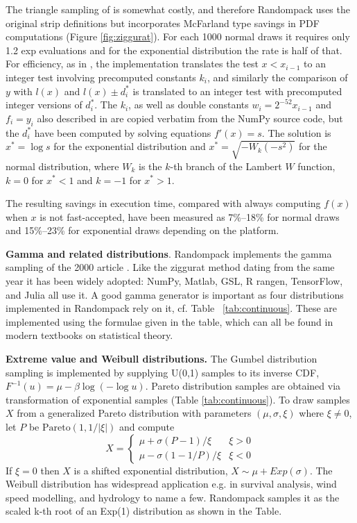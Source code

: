 \documentclass[manuscript,screen,review]{acmart}
\begin{document}
The triangle sampling of \cite{McFarland2016} is somewhat costly, and
therefore Randompack uses the original strip definitions but
incorporates McFarland type savings in PDF computations (Figure
\ref{fig:ziggurat}). For each 1000 normal draws it requires only 1.2
exp evaluations and for the exponential distribution the rate is half
of that. For efficiency, as in \cite{marsaglia2000ziggurat}, the
implementation translates the test $x < x_{i-1}$ to an integer test
involving precomputed constants $k_i$, and similarly the comparison of
$y$ with $l(x)$ and $l(x) \pm d_i^*$ is translated to an integer test
with precomputed integer versions of $d_i^*$. The $k_i$, as well as
double constants $w_i = 2^{-52}x_{i-1}$ and $f_i = y_i$ also described
in \cite{marsaglia2000ziggurat} are copied verbatim from the NumPy
source code, but the $d_i^*$ have been computed by solving equations
$f'(x) = s$. The solution is $x^* = \log s$ for the exponential
distribution and $x^* = \sqrt{-W_k(-s^2)}$ for the normal
distribution, where $W_k$ is the $k$-th branch of the Lambert $W$
function, $k=0$ for $x^* < 1$ and $k=-1$ for $x^* > 1$.

The resulting savings in execution time, compared with always
computing $f(x)$ when $x$ is not fast-accepted, have been measured as
7\%–18\% for normal draws and 15\%–23\% for exponential draws
depending on the platform.

\textbf{Gamma and related distributions}. Randompack implements the
gamma sampling of the 2000 article \cite{marsaglia2000gamma}. Like the
ziggurat method dating from the same year it has been widely adopted:
NumPy, Matlab, GSL, R rangen, TensorFlow, and Julia all use it. A good
gamma generator is important as four distributions implemented in
Randompack rely on it, cf. Table ~\ref{tab:continuous}. These are
implemented using the formulae given in the table, which can all be
found in modern textbooks on statistical theory.

\textbf{Extreme value and Weibull distributions.} The Gumbel
distribution sampling is implemented by supplying U(0,1) samples to
its inverse CDF, $F^{-1}(u)=\mu-\beta \log(-\log u)$. Pareto
distribution samples are obtained via transformation of exponential
samples (Table \ref{tab:continuous}). To draw samples $X$ from a
generalized Pareto distribution with parameters $(\mu, \sigma, \xi)$
where $\xi \neq 0$, let $P$ be $\mathrm{Pareto}(1, 1/|\xi|)$ and
compute
$$
X =
\begin{cases}
  \mu + \sigma(P-1)/\xi   & \xi > 0 \\
  \mu - \sigma(1-1/P)/\xi & \xi < 0
\end{cases}
$$
If $\xi = 0$ then $X$ is a shifted exponential distribution, $X \sim
\mu + Exp(\sigma)$. The Weibull distribution has widespread
application e.g. in survival analysis, wind speed modelling, and
hydrology to name a few. Randompack samples it as the scaled k-th root
of an Exp(1) distribution as shown in the Table.
\end{document}
